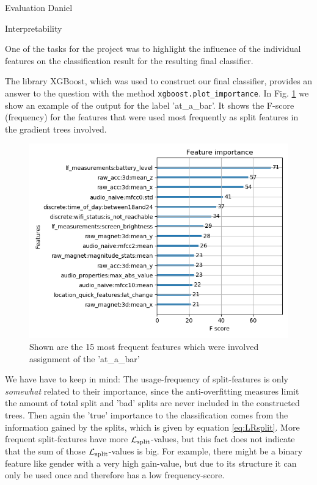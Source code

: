 \begin{section}{Evaluation Daniel}
	
\begin{subsection}{Interpretability}
	
	One of the tasks for the project was to highlight the influence of the individual features on the classification result for the resulting final classifier.
	
	The library XGBoost, which was used to construct our final classifier, provides an answer to the question with the method \texttt{xgboost.plot\_importance}. In Fig. \ref{abb:feature_importance} we show an example of the output for the label 'at\_a\_bar'. It shows the F-score (frequency) for the features that were used most frequently as split features in the gradient trees involved.
	  
	
	\begin{figure}[H]
		\begin{center}
			\includegraphics[width=.8\textwidth]{images/feature_importance.png}
			\caption{Shown are the 15 most frequent features which were involved assignment of the 'at\_a\_bar'}
			\label{abb:feature_importance}
		\end{center}		
	\end{figure}

    We have have to keep in mind: The usage-frequency of split-features is only \textit{somewhat} related to their importance, since the anti-overfitting measures limit the amount of total split and 'bad' splits are never included in the constructed trees. Then again the 'true' importance to the classification comes from the information gained by the splits, which is given by equation \ref{eq:LRsplit}. More frequent split-features have more $\mathcal{L}_\text{split}$-values, but this fact does not indicate that the sum of those $\mathcal{L}_\text{split}$-values is big. For example, there might be a binary feature like gender with a very high gain-value, but due to its structure it can only be used once and therefore has a low frequency-score.
    

\end{subsection}
\end{section}
